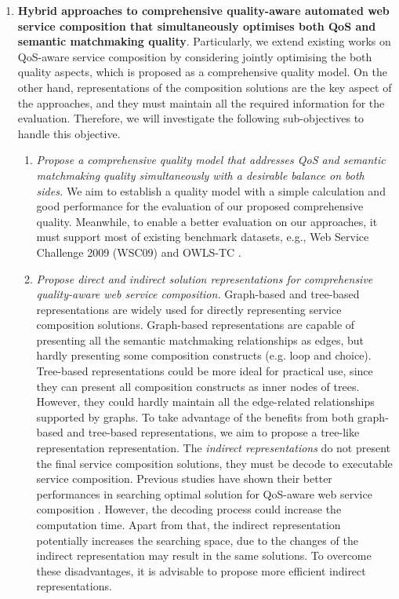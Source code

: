 \begin{enumerate}
  \item \textbf{Hybrid approaches to comprehensive quality-aware automated web service composition that simultaneously optimises both QoS and semantic matchmaking quality}. Particularly, we extend existing works on QoS-aware service composition by considering jointly optimising the both quality aspects, which is proposed as a comprehensive quality model. On the other hand, representations of the composition solutions are the key aspect of the approaches, and they must maintain all the required information for the evaluation. Therefore, we will investigate the following sub-objectives to handle this objective.
  \begin{enumerate}
    \item \emph{Propose a comprehensive quality model that addresses QoS and semantic matchmaking quality simultaneously with a desirable balance on both sides.} We aim to establish a quality model with a simple calculation and good performance for the evaluation of our proposed comprehensive quality. Meanwhile, to enable a better evaluation on our approaches, it must support most of existing benchmark datasets, e.g., Web Service Challenge 2009 (WSC09)\cite{kona2009wsc} and OWLS-TC \cite{kuster2008opossum}.
    
    \item \emph{Propose direct and indirect solution representations for comprehensive quality-aware web service composition.} Graph-based and tree-based representations are widely used for directly representing service composition solutions. Graph-based representations are capable of presenting all the semantic matchmaking relationships as edges, but hardly presenting some composition constructs (e.g. loop and choice). Tree-based representations could be more ideal for practical use, since they can present all composition constructs as inner nodes of trees. However, they could hardly maintain all the edge-related relationships supported by graphs. To take advantage of the benefits from both graph-based and tree-based representations, we aim to propose a tree-like representation representation. The \emph{indirect representations} do not present the final service composition solutions, they must be decode to executable service composition. Previous studies have shown their better performances in searching optimal solution for QoS-aware web service composition \cite{da2016memetic,da2016particle}. However, the decoding process could increase the computation time. Apart from that, the indirect representation potentially increases the searching space, due to the changes of the indirect representation may result in the same solutions. To overcome these disadvantages, it is advisable to propose more efficient indirect representations.
    

\end{enumerate}
\end{enumerate}
